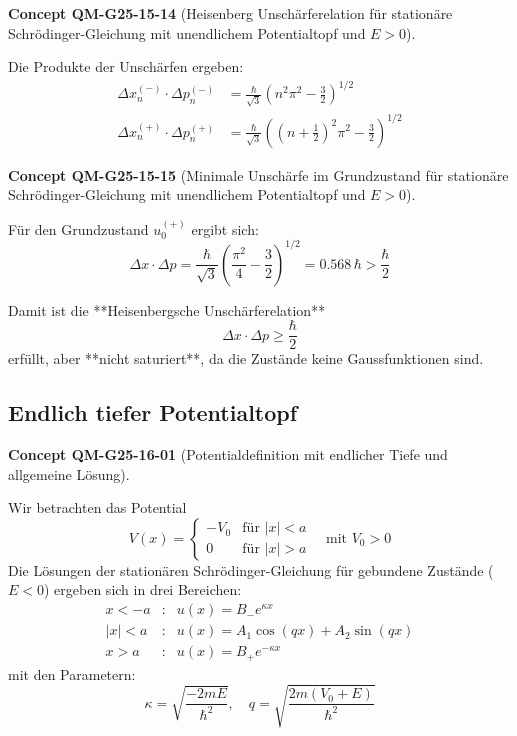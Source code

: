 \documentclass[10pt, letterpaper]{article}
\newcommand{\CustomHeading}[3]{%
  \par\medskip\noindent%
  \textbf{#1 #2} \textnormal{(#3)}.\enskip%
}
\newenvironment{CONC}[2]{\CustomHeading{Concept}{#1}{#2}}{}
\begin{document}
\begin{CONC}{QM-G25-15-14}{Heisenberg Unschärferelation für stationäre Schrödinger-Gleichung mit unendlichem Potentialtopf und $E>0$}
Die Produkte der Unschärfen ergeben:
\[
\begin{aligned}
\Delta x_n^{(-)} \cdot \Delta p_n^{(-)} &= \frac{\hbar}{\sqrt{3}} \left(n^2 \pi^2 - \frac{3}{2} \right)^{1/2} \\
\Delta x_n^{(+)} \cdot \Delta p_n^{(+)} &= \frac{\hbar}{\sqrt{3}} \left((n + \tfrac{1}{2})^2 \pi^2 - \frac{3}{2} \right)^{1/2}
\end{aligned}
\]
\end{CONC}

\begin{CONC}{QM-G25-15-15}{Minimale Unschärfe im Grundzustand für stationäre Schrödinger-Gleichung mit unendlichem Potentialtopf und $E>0$}
Für den Grundzustand \( u_0^{(+)} \) ergibt sich:
\[
\Delta x \cdot \Delta p = \frac{\hbar}{\sqrt{3}} \left( \frac{\pi^2}{4} - \frac{3}{2} \right)^{1/2}
= 0.568\, \hbar > \frac{\hbar}{2}
\]

Damit ist die **Heisenbergsche Unschärferelation**
\[
\Delta x \cdot \Delta p \geq \frac{\hbar}{2}
\]
erfüllt, aber **nicht saturiert**, da die Zustände keine Gaussfunktionen sind.
\end{CONC}

\subsection{Endlich tiefer Potentialtopf}

\begin{CONC}{QM-G25-16-01}{Potentialdefinition mit endlicher Tiefe und allgemeine Lösung}
Wir betrachten das Potential
\[
V(x) = \begin{cases}
    -V_0 & \text{für } |x| < a \\
    0    & \text{für } |x| > a
\end{cases}
\quad \text{mit } V_0 > 0
\]
Die Lösungen der stationären Schrödinger-Gleichung für gebundene Zustände ($E<0$) ergeben sich in drei Bereichen:
\[
\begin{array}{rll}
x < -a       & : & u(x) = B_- e^{\kappa x} \\
|x| < a      & : & u(x) = A_1 \cos(qx) + A_2 \sin(qx) \\
x > a        & : & u(x) = B_+ e^{-\kappa x}
\end{array}
\]
mit den Parametern:
\[
\kappa = \sqrt{\frac{-2mE}{\hbar^2}}, \quad q = \sqrt{\frac{2m(V_0 + E)}{\hbar^2}}
\]
\end{CONC}
\end{document}
